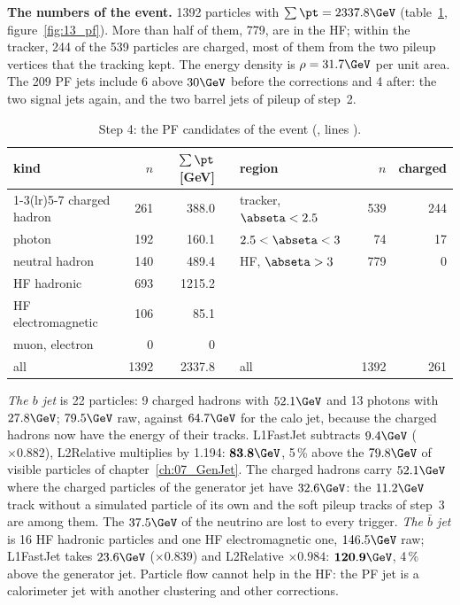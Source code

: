 \textbf{The numbers of the event.} 1392 particles with $\sum\pt=2337.8\GeV$ (table~\ref{tab:13_pf},
figure~\ref{fig:13_pf}). More than half of them, 779, are in the HF; within the tracker, 244 of the 539 particles are
charged, most of them from the two pileup vertices that the tracking kept. The energy density is $\rho=31.7\GeV$ per
unit area. The 209 PF jets include 6 above $30\GeV$ before the corrections and 4 after: the two signal jets again, and
the two barrel jets of pileup of step~2.

\begin{table}[!htb]
\centering\small
\caption{Step 4: the PF candidates of the event (, lines ).}
\label{tab:13_pf}
\begin{tabular}{l rr c l rr}
\toprule
kind & $n$ & $\sum\pt$ [GeV] & & region & $n$ & charged \\
\cmidrule(lr){1-3}\cmidrule(lr){5-7}
charged hadron & 261 & 388.0 & & tracker, $\abseta<2.5$ & 539 & 244 \\
photon & 192 & 160.1 & & $2.5<\abseta<3$ & 74 & 17 \\
neutral hadron & 140 & 489.4 & & HF, $\abseta>3$ & 779 & 0 \\
HF hadronic & 693 & 1215.2 & & & & \\
HF electromagnetic & 106 & 85.1 & & & & \\
muon, electron & 0 & 0 & & & & \\
\midrule
all & 1392 & 2337.8 & & all & 1392 & 261 \\
\bottomrule
\end{tabular}
\end{table}

\emph{The $b$ jet} is 22 particles: 9 charged hadrons with $52.1\GeV$ and 13 photons with $27.8\GeV$; $79.5\GeV$ raw,
against $64.7\GeV$ for the calo jet, because the charged hadrons now have the energy of their tracks. L1FastJet
subtracts $9.4\GeV$ ($\times0.882$), L2Relative multiplies by 1.194: $\mathbf{83.8\GeV}$, 5\,\% above the $79.8\GeV$ of
visible particles of chapter~\ref{ch:07_GenJet}. The charged hadrons carry $52.1\GeV$ where the charged particles of the
generator jet have $32.6\GeV$: the $11.2\GeV$ track without a simulated particle of its own and the soft pileup
tracks of step~3 are among them. The $37.5\GeV$ of the neutrino are lost to every
trigger. \emph{The $\bar b$ jet} is 16 HF hadronic particles and one HF electromagnetic one, $146.5\GeV$ raw;
L1FastJet takes $23.6\GeV$ ($\times0.839$) and L2Relative $\times0.984$: $\mathbf{120.9\GeV}$, 4\,\% above the
generator jet. Particle flow cannot help in the HF: the PF jet is a calorimeter jet with another clustering and other
corrections.

